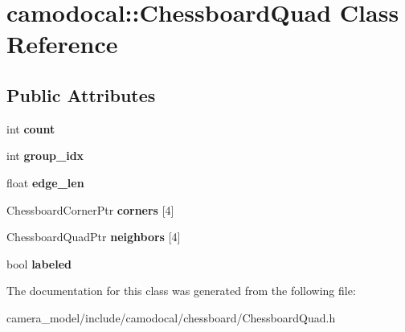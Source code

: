 \hypertarget{classcamodocal_1_1ChessboardQuad}{}\section{camodocal\+:\+:Chessboard\+Quad Class Reference}
\label{classcamodocal_1_1ChessboardQuad}
\subsection*{Public Attributes}
\begin{DoxyCompactItemize}
\item 
\mbox{\label{classcamodocal_1_1ChessboardQuad_aed35e8dd71b415587a19cbb6c983c32b}} 
int {\bfseries count}
\item 
\mbox{\label{classcamodocal_1_1ChessboardQuad_a2fd593afa16914e6a7c083c884707174}} 
int {\bfseries group\+\_\+idx}
\item 
\mbox{\label{classcamodocal_1_1ChessboardQuad_a7fd10c9c5db21c8d3f687dd487d1c87b}} 
float {\bfseries edge\+\_\+len}
\item 
\mbox{\label{classcamodocal_1_1ChessboardQuad_a01a4a0853a20b632cd699753408b07e5}} 
Chessboard\+Corner\+Ptr {\bfseries corners} \mbox{[}4\mbox{]}
\item 
\mbox{\label{classcamodocal_1_1ChessboardQuad_af51a4f6d2b1a587a1073cc300588ac92}} 
Chessboard\+Quad\+Ptr {\bfseries neighbors} \mbox{[}4\mbox{]}
\item 
\mbox{\label{classcamodocal_1_1ChessboardQuad_a7412b07c4da71f8c80f5267a1c7ae342}} 
bool {\bfseries labeled}
\end{DoxyCompactItemize}


The documentation for this class was generated from the following file\+:\begin{DoxyCompactItemize}
\item 
camera\+\_\+model/include/camodocal/chessboard/Chessboard\+Quad.\+h\end{DoxyCompactItemize}
